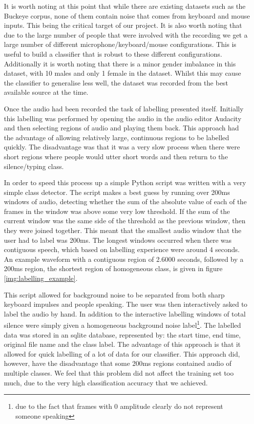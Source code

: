 \documentclass[ %
                    author={Sam Phippen},
                supervisor={Dr. Rafal Bogacz},
                     title={Real time voice activity detectors in noisy personal computing environments},
                  subtitle={},
                    degree={MEng},
                      year={2012} ]{thesis}
\begin{document}
It is worth noting at this point that while there are existing datasets such as
the Buckeye corpus\cite{buckeye}, none of them contain noise that comes from
keyboard and mouse inputs. This being the critical target of our project. It is
also worth noting that due to the large number of people that were involved
with the recording we get a large number of different microphone/keyboard/mouse
configurations. This is useful to build a classifier that is robust to these
different configurations. Additionally it is worth noting that there is a minor
gender imbalance in this dataset, with 10 males and only 1 female in the
dataset. Whilst this may cause the classifier to generalise less well, the
dataset was recorded from the best available source at the time.

Once the audio had been recorded the task of labelling presented itself.
Initially this labelling was performed by opening the audio in the audio editor
Audacity\cite{audacity} and then selecting regions of audio and playing them
back. This approach had the advantage of allowing relatively large, continuous
regions to be labelled quickly. The disadvantage was that it was a very slow
process when there were short regions where people would utter short words and
then return to the silence/typing class.

In order to speed this process up a simple Python script was written with a
very simple class detector. The script makes a best guess by running over
200ms windows of audio, detecting whether the sum of the absolute value of each
of the frames in the window was above some very low threshold. If the sum of
the current window was the same side of the threshold as the previous window,
then they were joined together. This meant that the smallest audio window that
the user had to label was 200ms. The longest windows occurred when there was
contiguous speech, which based on labelling experience were around 4 seconds.
An example waveform with a contiguous region of 2.6000 seconds, followed by a
200ms region, the shortest region of homogeneous class, is given in figure
\ref{img:labelling_example}.

This script allowed for background noise to be separated from both sharp
keyboard impulses and people speaking. The user was then interactively asked to
label the audio by hand. In addition to the interactive labelling windows of
total silence were simply given a homogeneous background noise
label\footnote{due to the fact that frames with 0 amplitude clearly do not
represent someone speaking}. The labelled data was stored in an sqlite
database, represented by: the start time, end time, original file name and the
class label. The advantage of this approach is that it allowed for quick
labelling of a lot of data for our classifier. This approach did, however, have
the disadvantage that some 200ms regions contained audio of multiple classes.
We feel that this problem did not affect the training set too much, due to the
very high classification accuracy that we achieved.
\end{document}

